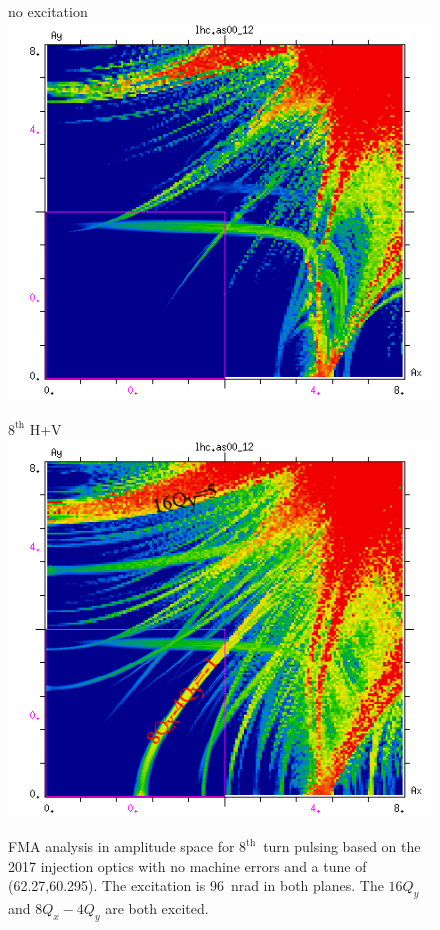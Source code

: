 \documentclass[%
 reprint,
 amsmath,amssymb,
 aps,
prstab,
]{revtex4-1}
\begin{document}
\begin{figure}[t]
	\begin{minipage}[t]{0.49\linewidth}
		\centering
		no excitation
		\includegraphics[width=1.0\linewidth]{2017injnocolc15o+19_6noerru_dp0_amp.png}
	\end{minipage}
	\begin{minipage}[t]{0.49\linewidth}
		\centering
		$8^{\mathrm{th}}$ H+V
		\includegraphics[width=1.0\linewidth]{2017injnocolc15o+19_6noerrut8skhv_dp0_amp_annotate.png}
	\end{minipage}	
	\caption{\label{fig:8th2017fmaamp} FMA analysis in amplitude space for $8^{\mathrm{th}}$~turn pulsing based on the 2017 injection optics with no machine errors and a tune of (62.27,60.295). The excitation is 96~nrad in both planes. The $16Q_y$ and \mbox{$8Q_x-4Q_y$} are both excited.}
\end{figure}
\end{document}
